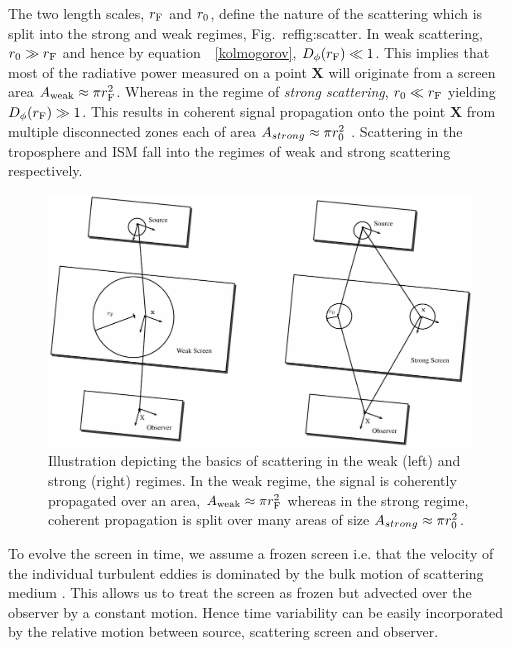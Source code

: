 The two length scales, $r_{\rm F}$ and $r_{\rm 0}$, define the nature of the scattering which is split into the strong and weak regimes, Fig.~ref{fig:scatter}. In weak scattering, $ r_{\rm 0} \gg r_{\rm F}$ and hence by equation\ ~\ref{kolmogorov}, $D_{\phi}(r_{\rm F}) \ll 1$. This implies that most of the radiative power measured on a point $\mathbf{X}$ will originate from a screen area $A_{\rm weak} \approx \pi r_{\rm F}^2$. Whereas in the regime of \emph{strong scattering}, $ r_{\rm 0} \ll r_{\rm F}$ yielding  $D_{\phi}(r_{\rm F}) \gg 1$. This  results in coherent signal propagation onto the point $\mathbf{X}$ from multiple disconnected zones each of area $A_{strong} \approx \pi r_{\rm 0}^2$ \citep{Narayan_1992}. Scattering in the troposphere and ISM fall into the regimes of weak and strong scattering respectively.

\begin{figure}
\begin{center}
\includegraphics[width=1.\columnwidth]{Images/scatter.pdf}
\caption{Illustration depicting the basics of scattering in the weak (left) and strong (right) regimes. In the weak regime, the signal is coherently propagated over an area, $A_{\rm weak} \approx \pi r_{\rm F}^2$ whereas in the strong regime, coherent propagation is split over many areas of size $A_{strong} \approx \pi r_{\rm 0}^2$. \label{fig:scatter}
}
\end{center}
\end{figure}

To evolve the screen in time, we assume a frozen screen i.e. that the velocity of the individual turbulent eddies is dominated by the bulk motion of scattering medium \citep[e.g.][]{Lay_1997}. This allows us to treat the screen as frozen but advected over the observer by a constant motion. Hence time variability can be easily incorporated by the relative motion between source, scattering screen and observer.


